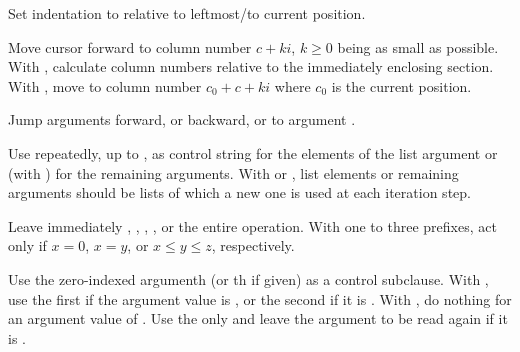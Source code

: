 \begin{LIST}{1cm}
\begin{LIST}{.5cm}
    {%
      Set indentation to  relative to leftmost/to current
      position. 
    }

    {%
      Move cursor forward to column number $c + ki$, $k \geq 0$ being as small
      as possible. With \kwd{:}, calculate column numbers relative to
      the immediately enclosing section. With , move to column
      number $c_0 + c + ki$ where $c_0$ is the current position.
    }

    {%
      Jump  arguments forward, or backward, or to argument .
    }

    {%
      Use  repeatedly, up to , as control
      string for the elements of the list argument or (with
      ) for the remaining arguments. With \kwd{:} or ,
      list elements or remaining arguments should be
      lists of which a new one is used at each iteration step.
    }

    {%
      Leave immediately \kwd{\TLD\boldmath{$<$} \TLD\boldmath{$>$}},
      \kwd{\TLD\boldmath{$<$} \TLD:\boldmath{$>$}}, 
      \kwd{\TLD\boldmath{$\{$} \TLD\boldmath{$\}$}}, , or the
      entire  operation. With one to three prefixes, act only
      if $x=0$, $x=y$, or $x\leq y \leq z$, respectively.
    }

    {%
      Use the zero-indexed argumenth (or
      th if given)  as a  control subclause.
      With \kwd{:}, use the first  if the argument value is
      \NIL, or the second  if it is \T. With , do nothing
      for an argument value of \NIL. Use the only  and leave
      the argument to be read again if it is \T.
    }


\end{LIST}
\end{LIST}

